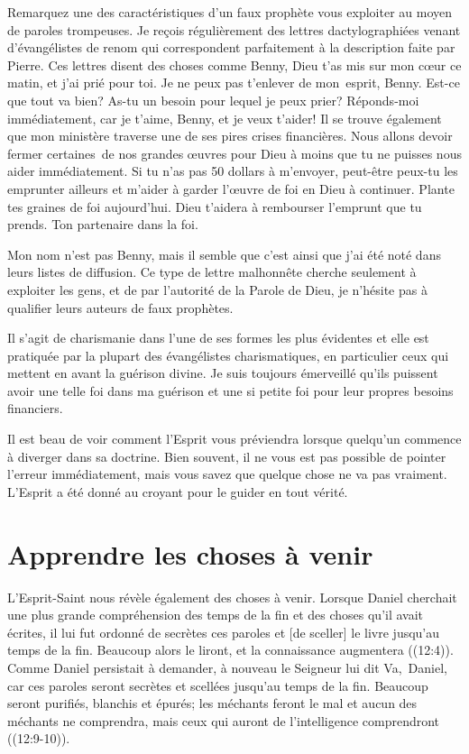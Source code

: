Remarquez une des caractéristiques d'un faux prophète\frcolon{}
 \Og vous exploiter au moyen de paroles trompeuses. \Fg{}
 Je reçois régulièrement des lettres dactylographiées
 venant d'évangélistes de renom qui correspondent parfaitement
 à la description faite par Pierre.
 Ces lettres disent des choses comme\frcolon{}
 \Og Benny, Dieu t'as mis sur mon cœur ce matin, et j'ai prié pour toi.
 Je ne peux pas t'enlever de mon~esprit, Benny.
 Est-ce que tout va bien? As-tu un besoin pour lequel je peux prier?
 Réponds-moi immédiatement, car je t'aime, Benny, et je veux t'aider!
 Il se trouve également que mon ministère traverse
 une de ses pires crises financières.
 Nous allons devoir fermer certaines~de nos grandes œuvres pour Dieu
 à moins que tu ne puisses nous aider immédiatement.
 Si tu n'as pas 50 dollars à m'envoyer, peut-être peux-tu les emprunter
 ailleurs et m'aider à garder l'œuvre de foi en Dieu à continuer.
 Plante tes graines de foi aujourd'hui.
 Dieu t'aidera à rembourser l'emprunt que tu prends.
 Ton partenaire dans la foi. \Fg{}

Mon nom n'est pas Benny, mais il semble que c'est ainsi que j'ai été noté
 dans leurs listes de diffusion.
 Ce type de lettre malhonnête cherche seulement à exploiter les gens,
 et de par l'autorité de la Parole de Dieu,
 je n'hésite pas à qualifier leurs auteurs de faux prophètes.

Il s'agit de charismanie dans l'une de ses formes les plus évidentes
 et elle est pratiquée par la plupart des évangélistes charismatiques,
 en particulier ceux qui mettent en avant la guérison divine.
 Je suis toujours émerveillé qu'ils puissent avoir une telle foi
 dans ma guérison et une si petite foi pour leur propres besoins financiers.

Il est beau de voir comment l'Esprit vous préviendra
 lorsque quel\-qu'un commence à diverger dans sa doctrine.
 Bien souvent, il ne vous est pas possible de pointer l'erreur immédiatement,
 mais vous savez que quelque chose ne va pas vraiment.
 L'Esprit a été donné au croyant pour le guider en tout vérité.


\section{Apprendre les choses \`a venir}

L'Esprit-Saint nous révèle également des choses à venir.
 Lorsque Daniel cherchait une plus grande compréhension des temps de la fin
 et des choses qu'il avait écrites, il lui fut ordonné de
 \Og [tenir] secrètes ces paroles et [de sceller] le livre
 jusqu'au temps de la fin.
 Beaucoup alors le liront, et la connaissance augmentera \Fg{}
 ((12:4)).
 Comme Daniel persistait à demander, à nouveau le Seigneur lui dit\frcolon{}
 \Og Va,~Daniel, car ces paroles seront secrètes
 et scellées jusqu'au temps de la fin.
 Beaucoup seront purifiés, blanchis et épurés;
 les méchants feront le mal et aucun des méchants ne comprendra,
 mais ceux qui auront de l'intelligence comprendront \Fg{}
 ((12:9-10)).

